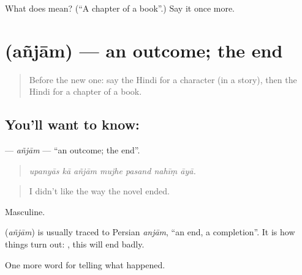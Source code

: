 \begin{tcolorbox}[breakable,colback=teal!4,colframe=teal!35!black,title={Before you move on}]
What does  mean? (\textquotedblleft{}A chapter of a book\textquotedblright{}.) Say it once more.
\end{tcolorbox}
\section[\texorpdfstring{\hi{अंजाम} (añjām)}{अंजाम (añjām)}]{ (añjām) — an outcome; the end}

\label{lesson:HI-C340-anjam}



\begin{quote}
Before the new one: say the Hindi for a character (in a story), then the Hindi for a chapter of a book.
\end{quote}

\subsection*{You'll want to know: }
\textbf{} — \emph{añjām} — \textquotedblleft{}an outcome; the end\textquotedblright{}.

\begin{quote}
      
\end{quote}

\begin{quote}
\emph{upanyās kā añjām mujhe pasand nahīṃ āyā.}
\end{quote}

\begin{quote}
I didn't like the way the novel ended.
\end{quote}

Masculine.

\begin{cousinweb}
\textbf{} (\emph{añjām}) is usually traced to Persian \emph{anjām}, \textquotedblleft{}an end, a completion\textquotedblright{}. It is how things turn out: \textbf{   }, this will end badly.
\end{cousinweb}

\begin{grammarlens}[title={What you've built}]
One more word for telling what happened.
\end{grammarlens}


